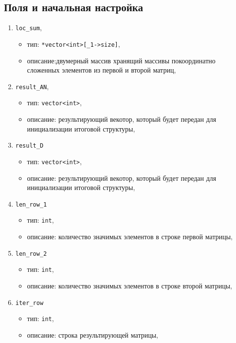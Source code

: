 \subsection*{Поля и начальная настройка}
\begin{enumerate}
	\item \texttt{loc\_sum},
	\begin{itemize}
		\item тип: \texttt{*vector<int>[\_1->size]},
		\item описание:двумерный массив хранящий массивы покоординатно сложенных элементов из первой и второй матриц,
	\end{itemize}
	
	\item \texttt{result\_AN},
	\begin{itemize}
		\item тип: \texttt{vector<int>},
		\item описание: результирующий векотор, который будет передан для инициализации итоговой структуры,
	\end{itemize}
	
	\item \texttt{result\_D}
	\begin{itemize}
		\item тип: \texttt{vector<int>},
		\item описание: результирующий векотор, который будет передан для инициализации итоговой структуры,
	\end{itemize}
	
	\item \texttt{len\_row\_1}
	\begin{itemize}
		\item тип: \texttt{int},
		\item описание: количество значимых элементов в строке первой матрицы,
	\end{itemize}
	
	\item \texttt{len\_row\_2}
	\begin{itemize}
		\item тип: \texttt{int},
		\item описание: количество значимых элементов в строке второй матрицы,
	\end{itemize}
	
	\item \texttt{iter\_row}
	\begin{itemize}
		\item тип: \texttt{int},
		\item описание: строка результирующей матрицы,
	\end{itemize}
	

\end{enumerate}
